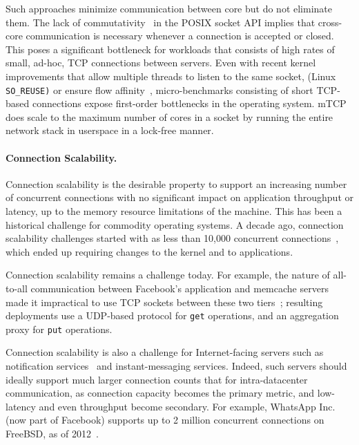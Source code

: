 Such approaches minimize communication between core but do not
eliminate them.  The lack of
commutativity~\cite{DBLP:conf/sosp/ClementsKZMK13} in the POSIX socket
API implies that cross-core communication is necessary whenever a
connection is accepted or closed.  This poses a significant bottleneck
for workloads that consists of high rates of small, ad-hoc, TCP
connections between servers.  Even with recent kernel improvements that
allow multiple threads to listen to the same socket, (Linux
\texttt{SO\_REUSE)} or ensure flow
affinity~\cite{DBLP:conf/eurosys/PesterevSZM12}, micro-benchmarks
consisting of short TCP-based connections expose first-order
bottlenecks in the operating system.  mTCP~\cite{jeong2014mtcp} does
scale to the maximum number of cores in a socket by running the entire
network stack in userspace in a lock-free manner.


\paragraph{Connection Scalability.}

Connection scalability is the desirable property to support an
increasing number of concurrent connections with no significant impact
on application throughput or latency, up to the memory resource
limitations of the machine.  This has been a historical challenge for
commodity operating systems.  A decade ago, connection scalability
challenges started with as less than 10,000 concurrent
connections~\cite{theC10Kproblem}, which ended up requiring changes to
the kernel and to applications.

Connection scalability remains a challenge today.  For example, the
nature of all-to-all communication between Facebook's application and
memcache servers made it impractical to use TCP sockets between these
two tiers~\cite{nishtala2013scaling}; resulting deployments use a
UDP-based protocol for \texttt{get} operations, and an aggregation
proxy for \texttt{put} operations.

Connection scalability is also a challenge for Internet-facing servers
such as notification services~\cite{DBLP:conf/sosp/AdyaCMP11} and
instant-messaging services.  Indeed, such servers should ideally
support much larger connection counts that for intra-datacenter
communication, as connection capacity becomes the primary metric, and
low-latency and even throughput become secondary.  For example,
WhatsApp Inc. (now part of Facebook) supports up to 2 million concurrent connections on FreeBSD, as
of 2012~\cite{whatsapp-2mil}.  

